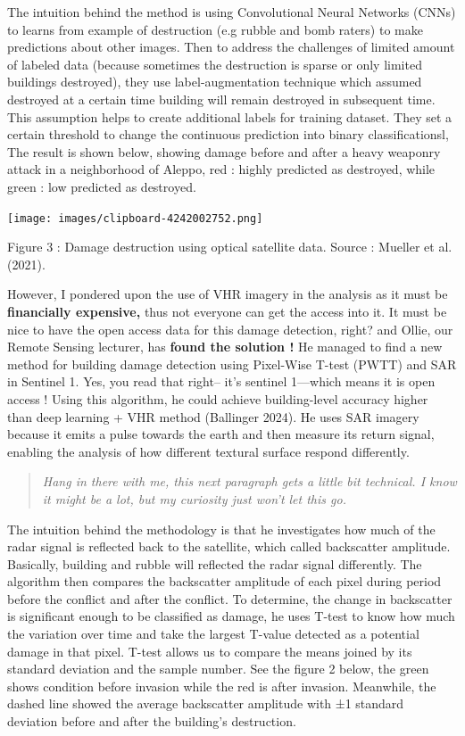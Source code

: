 \documentclass[
  letterpaper,
  DIV=11,
  numbers=noendperiod]{scrreprt}
\begin{document}
The intuition behind the method is using Convolutional Neural Networks
(CNNs) to learns from example of destruction (e.g rubble and bomb
raters) to make predictions about other images. Then to address the
challenges of limited amount of labeled data (because sometimes the
destruction is sparse or only limited buildings destroyed), they use
label-augmentation technique which assumed destroyed at a certain time
building will remain destroyed in subsequent time. This assumption helps
to create additional labels for training dataset. They set a certain
threshold to change the continuous prediction into binary
classificationsl, The result is shown below, showing damage before and
after a heavy weaponry attack in a neighborhood of Aleppo, red : highly
predicted as destroyed, while green : low predicted as destroyed.

\texttt{[image: images/clipboard-4242002752.png]}

Figure 3 : Damage destruction using optical satellite data. Source :
Mueller et al. (2021).

However, I pondered upon the use of VHR imagery in the analysis as it
must be \textbf{financially expensive,} thus not everyone can get the
access into it. It must be nice to have the open access data for this
damage detection, right? and Ollie, our Remote Sensing lecturer, has
\textbf{found the solution !} He managed to find a new method for
building damage detection using Pixel-Wise T-test (PWTT) and SAR in
Sentinel 1. Yes, you read that right-- it's sentinel 1---which means it
is open access ! Using this algorithm, he could achieve building-level
accuracy higher than deep learning + VHR method (Ballinger 2024). He
uses SAR imagery because it emits a pulse towards the earth and then
measure its return signal, enabling the analysis of how different
textural surface respond differently.

\begin{quote}
\emph{Hang in there with me, this next paragraph gets a little bit
technical. I know it might be a lot, but my curiosity just won't let
this go.}
\end{quote}

The intuition behind the methodology is that he investigates how much of
the radar signal is reflected back to the satellite, which called
backscatter amplitude. Basically, building and rubble will reflected the
radar signal differently. The algorithm then compares the backscatter
amplitude of each pixel during period before the conflict and after the
conflict. To determine, the change in backscatter is significant enough
to be classified as damage, he uses T-test to know how much the
variation over time and take the largest T-value detected as a potential
damage in that pixel. T-test allows us to compare the means joined by
its standard deviation and the sample number. See the figure 2 below,
the green shows condition before invasion while the red is after
invasion. Meanwhile, the dashed line showed the average backscatter
amplitude with ±1 standard deviation before and after the building's
destruction.
\end{document}
